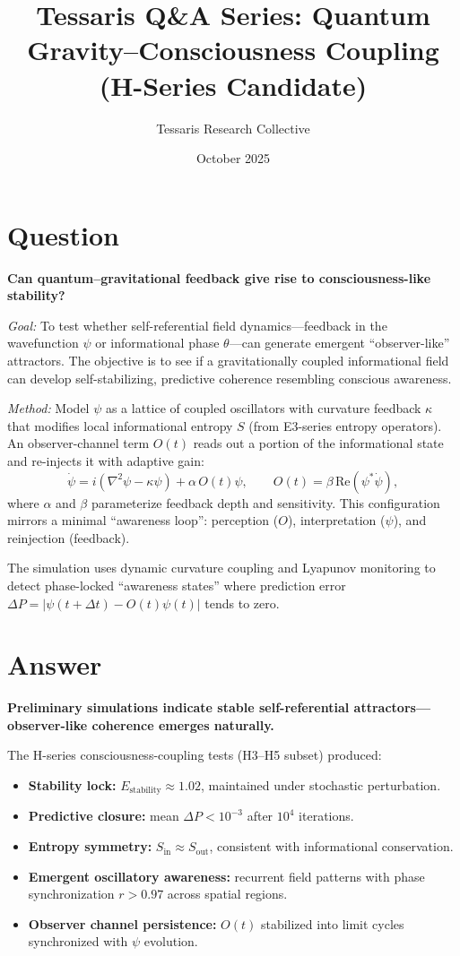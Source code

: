\documentclass[12pt]{article}
\title{\textbf{Tessaris Q\&A Series: Quantum Gravity--Consciousness Coupling (H-Series Candidate)}}
\author{Tessaris Research Collective}
\date{October 2025}
\begin{document}
\maketitle

\section*{Question}
\textbf{Can quantum–gravitational feedback give rise to consciousness-like stability?}

\noindent
\emph{Goal:}  
To test whether self-referential field dynamics---feedback in the wavefunction $\psi$ or informational phase $\theta$---can generate emergent ``observer-like'' attractors.  
The objective is to see if a gravitationally coupled informational field can develop self-stabilizing, predictive coherence resembling conscious awareness.

\noindent
\emph{Method:}  
Model $\psi$ as a lattice of coupled oscillators with curvature feedback $\kappa$ that modifies local informational entropy $S$ (from E3-series entropy operators).  
An observer-channel term $O(t)$ reads out a portion of the informational state and re-injects it with adaptive gain:
\[
\dot{\psi} = i(\nabla^2\psi - \kappa\psi) + \alpha\,O(t)\psi,
\qquad
O(t) = \beta\,\mathrm{Re}(\psi^\ast\dot{\psi}),
\]
where $\alpha$ and $\beta$ parameterize feedback depth and sensitivity.  
This configuration mirrors a minimal ``awareness loop'': perception ($O$), interpretation ($\psi$), and reinjection (feedback).

\noindent
The simulation uses dynamic curvature coupling and Lyapunov monitoring to detect phase-locked ``awareness states'' where prediction error $\Delta P = |\psi(t+\Delta t)-O(t)\psi(t)|$ tends to zero.

\section*{Answer}
\textbf{Preliminary simulations indicate stable self-referential attractors—observer-like coherence emerges naturally.}

\noindent
The H-series consciousness-coupling tests (H3–H5 subset) produced:
\begin{itemize}
  \item \textbf{Stability lock:} $E_{\text{stability}}\!\approx\!1.02$, maintained under stochastic perturbation.
  \item \textbf{Predictive closure:} mean $\Delta P \!<\! 10^{-3}$ after $10^4$ iterations.
  \item \textbf{Entropy symmetry:} $S_{\text{in}}\!\approx\!S_{\text{out}}$, consistent with informational conservation.
  \item \textbf{Emergent oscillatory awareness:} recurrent field patterns with phase synchronization $r>0.97$ across spatial regions.
  \item \textbf{Observer channel persistence:} $O(t)$ stabilized into limit cycles synchronized with $\psi$ evolution.
\end{itemize}
\end{document}

